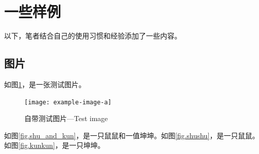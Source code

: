 
\section{一些样例}

以下，笔者结合自己的使用习惯和经验添加了一些内容。
\subsection{图片}

如图\ref{fig.test_figure}，是一张测试图片。
\begin{figure}[htb]
    \centering
    \texttt{[image: example-image-a]}
    \caption{自带测试图片---Test image}\label{fig.test_figure}
\end{figure}

如图\ref{fig.shu_and_kun}，是一只鼠鼠和一值坤坤。如图\ref{fig.shushu}，是一只鼠鼠。如图\ref{fig.kunkun}，是一只坤坤。

